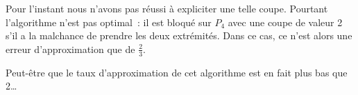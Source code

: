 Pour l'instant nous n'avons pas réussi à expliciter une telle
coupe. Pourtant l'algorithme n'est pas optimal~: il est bloqué sur
$P_4$ avec une coupe de valeur 2 s'il a la malchance de prendre les
deux extrémités. Dans ce cas, ce n'est alors une erreur
d'approximation que de $\frac{2}{3}$.

Peut-être que le taux d'approximation de cet algorithme est en fait
plus bas que 2\dots

